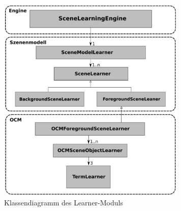 \begin{deprecated}
\cite{gehrung14}
\end{deprecated}
\begin{figure}
	\centering
	\includegraphics[width=9cm]{bilder/LearnerClass.pdf}
	\caption{Klassendiagramm des Learner-Moduls \cite{gehrung14}}
	\label{img:learnerclass}
\end{figure}

